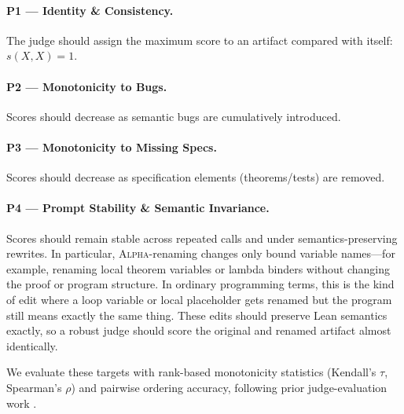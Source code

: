 \documentclass{article}
\begin{document}
\paragraph{P1 — Identity \& Consistency.}
The judge should assign the maximum score to an artifact compared with itself: \(s(X,X)=1\).

\paragraph{P2 — Monotonicity to Bugs.}
Scores should decrease as semantic bugs are cumulatively introduced.

\paragraph{P3 — Monotonicity to Missing Specs.}
Scores should decrease as specification elements (theorems/tests) are removed.

\paragraph{P4 — Prompt Stability \& Semantic Invariance.}
Scores should remain stable across repeated calls and under semantics-preserving rewrites.
In particular, \textsc{Alpha}-renaming changes only bound variable names---for example, renaming local theorem variables or lambda binders without changing the proof or program structure. In ordinary programming terms, this is the kind of edit where a loop variable or local placeholder gets renamed but the program still means exactly the same thing. These edits should preserve Lean semantics exactly, so a robust judge should score the original and renamed artifact almost identically.

We evaluate these targets with rank-based monotonicity statistics (Kendall's $\tau$, Spearman's $\rho$) and pairwise ordering accuracy, following prior judge-evaluation work \citep{TongZhang2024CodeJudge,Zhuo2024ICEScore}.
\end{document}
